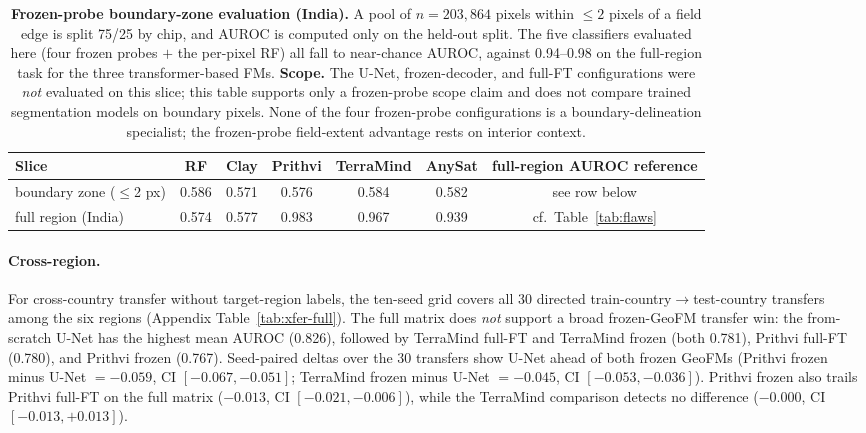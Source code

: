 \documentclass{article}
\newcommand{\tablebodygap}{\vspace{0.45em}}
\begin{document}
\begin{table}[H]\centering\small
\caption{\textbf{Frozen-probe boundary-zone evaluation (India).} A pool of
$n{=}203{,}864$ pixels within $\le 2$ pixels of a field edge is split 75/25 by chip,
and AUROC is computed only on the held-out split. The five classifiers evaluated here
(four frozen probes $+$ the per-pixel RF) all fall to near-chance AUROC, against
0.94--0.98 on the full-region task for the three transformer-based FMs.
\textbf{Scope.} The U-Net, frozen-decoder, and full-FT configurations were
\emph{not} evaluated on this slice; this table supports only a frozen-probe
scope claim and does not compare trained segmentation models on boundary
pixels. None of the four frozen-probe configurations is a boundary-delineation
specialist; the frozen-probe field-extent advantage rests on interior context.}
\label{tab:edgezone}
\tablebodygap
\begin{tabular}{lcccccc}
\toprule
Slice & RF & Clay & Prithvi & TerraMind & AnySat & full-region AUROC reference \\
\midrule
boundary zone ($\le$2 px) & 0.586 & 0.571 & 0.576 & 0.584 & 0.582 & see row below \\
full region (India)       & 0.574 & 0.577 & 0.983 & 0.967 & 0.939 & cf.\ Table~\ref{tab:flaws} \\
\bottomrule
\end{tabular}
\end{table}
\FloatBarrier

\paragraph{Cross-region.} For cross-country transfer without target-region
labels, the ten-seed grid covers all 30 directed train-country$\to$test-country
transfers among the six regions (Appendix Table~\ref{tab:xfer-full}). The full
matrix does \emph{not} support a broad frozen-GeoFM transfer win: the from-scratch
U-Net has the highest mean AUROC (0.826), followed by TerraMind full-FT and
TerraMind frozen (both 0.781), Prithvi full-FT (0.780), and Prithvi frozen
(0.767). Seed-paired deltas over the 30 transfers show U-Net ahead of both frozen
GeoFMs (Prithvi frozen minus U-Net $=-0.059$, CI $[-0.067,-0.051]$; TerraMind
frozen minus U-Net $=-0.045$, CI $[-0.053,-0.036]$). Prithvi frozen also trails
Prithvi full-FT on the full matrix ($-0.013$, CI $[-0.021,-0.006]$), while
the TerraMind comparison detects no difference ($-0.000$, CI
$[-0.013,+0.013]$).
\end{document}
